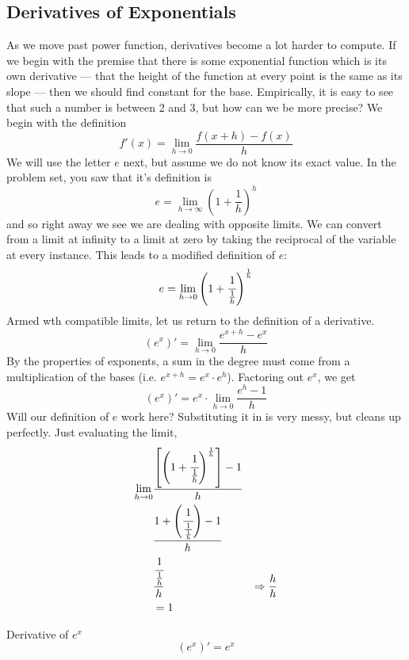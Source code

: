 

\subsection{Derivatives of Exponentials}




As we move past power function, derivatives become a lot harder to compute.  If we
begin with the premise that there is some exponential function which is its own 
derivative --- that the height of the function at every point is the same as its slope
--- then we should find constant for the base.  Empirically, it is easy to see that
such a number is between 2 and 3, but how can we be more precise?  We
begin with the definition
$$
f'(x) = \lim_{h\rightarrow0}\frac{f(x+h)-f(x)}{h}
$$
We will use the letter $e$ next, but assume we do not know its exact value.  In
the problem set, you saw that it's definition is
$$
e = \lim_{h\rightarrow\infty}\left(1+\frac{1}{h}\right)^h
$$
and so right away we see we are dealing with opposite limits.  We can convert
from a limit at infinity to a limit at zero by taking the reciprocal of the variable
at every instance.  This leads to a modified definition of $e$:
$$
e = \lim_{h\rightarrow0}\left(1+\cfrac{1}{\frac{1}{h}}\right)^{\frac{1}{h}}
$$
Armed wth compatible limits, let us return to the definition of a derivative.
$$
(e^x)'  = \lim_{h\rightarrow0}\frac{e^{x+h}-e^x}{h}
$$
By the properties of exponents, a sum in the degree must come
from a multiplication of the bases (i.e. $e^{x+h}=e^x\cdot{}e^h$).
Factoring out $e^x$, we get
$$
(e^x)' = e^x \cdot{}\lim_{h\rightarrow0}\frac{e^h-1}{h}
$$
Will our definition of $e$ work here?  Substituting it in is very messy, but cleans up
perfectly.  Just evaluating the limit,
\begin{align*}
	\lim_{h\rightarrow0} & \frac{\left[\left(1+\cfrac{1}{\frac{1}{h}}\right)^{\frac{1}{h}}\right]-1}{h} &\\
	& \frac{1+\left(\cfrac{1}{\frac{1}{\frac{1}{h}}}\right) - 1}{h} &\\
	& \frac{\cfrac{1}{\frac{1}{h}}}{h} & \Rightarrow \frac{h}{h} \\
	& = 1
\end{align*}

\begin{derivation}{Derivative of $e^x$}
$$
(e^x)' = e^x
$$
\end{derivation}

